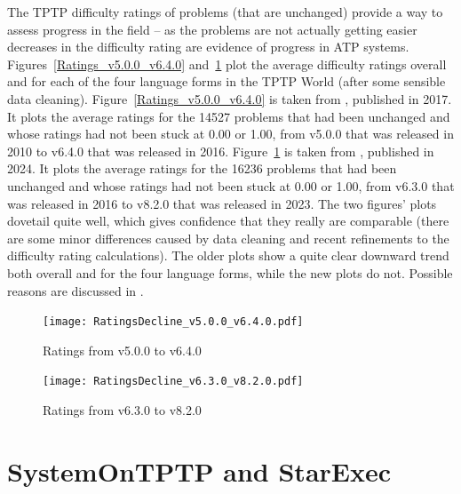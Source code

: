 \documentclass{easychair}
\begin{document}
The TPTP difficulty ratings of problems (that are unchanged) provide a way to assess progress 
in the field -- as the problems are not actually getting easier decreases in the difficulty
rating are evidence of progress in ATP systems.
Figures~\ref{Ratings_v5.0.0_v6.4.0} and~\ref{Ratings_v6.3.0_v8.2.0} plot the average difficulty
ratings overall and for each of the four language forms in the TPTP World (after some sensible
data cleaning).
Figure~\ref{Ratings_v5.0.0_v6.4.0} is taken from \cite{Sut17}, published in 2017.
It plots the average ratings for the 14527 problems that had been unchanged and whose ratings 
had not been stuck at 0.00 or 1.00, from v5.0.0 that was released in 2010 to v6.4.0 that was
released in 2016. 
Figure~\ref{Ratings_v6.3.0_v8.2.0} is taken from \cite{SK+24}, published in 2024.
It plots the average ratings for the 16236 problems that had been unchanged and whose ratings 
had not been stuck at 0.00 or 1.00, from v6.3.0 that was released in 2016 to v8.2.0 that was
released in 2023. 
The two figures’ plots dovetail quite well, which gives confidence that they really are 
comparable (there are some minor differences caused by data cleaning and recent refinements to 
the difficulty rating calculations). 
The older plots show a quite clear downward trend both overall and for the four language forms, 
while the new plots do not. 
Possible reasons are discussed in \cite{SK+24}.

\begin{figure}[t!]
\centering
\begin{minipage}[t]{.49\textwidth}
  \centering
  \texttt{[image: RatingsDecline\_v5.0.0\_v6.4.0.pdf]}
  \vspace*{-2em}
  \caption{Ratings from v5.0.0 to v6.4.0}
  \label{Ratings_v5.0.0_v6.4.0}
\end{minipage}
\begin{minipage}[t]{.49\textwidth}
  \centering
  \texttt{[image: RatingsDecline\_v6.3.0\_v8.2.0.pdf]}
  \vspace*{-2em}
  \caption{Ratings from v6.3.0 to v8.2.0}
  \label{Ratings_v6.3.0_v8.2.0}
\end{minipage}
\end{figure}

\section{SystemOnTPTP and StarExec}
\label{StarExec}
\end{document}
